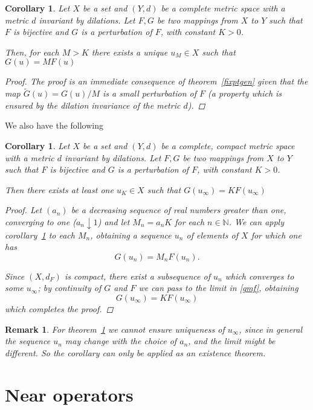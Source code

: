 \documentclass[12pt]{article}
\theoremstyle{normale}
\newtheorem{corollary}[theorem]{Corollary}
\theoremstyle{liscio}
\newtheorem{remark}[theorem]{Remark}
\begin{document}
\begin{corollary}\label{fixm}
Let $X$ be a set and $(Y, d)$ be a complete metric space with
a metric $d$ invariant by dilations. Let $F, G$ be two mappings
from $X$ to $Y$ such that $F$ is bijective and $G$ is
a perturbation of $F$, with constant $K > 0$.

Then, for each $M > K$ there exists a unique $u_M \in X$ such that
$G(u)=M F(u)$
\begin{proof}
The proof is an immediate consequence of theorem~\ref{fixptgen}
given that the map $\tilde G(u) = G(u)/M$ is a small perturbation
of $F$ (a property which is ensured by the dilation invariance of
the metric $d$).
\end{proof}
\end{corollary}

We also have the following
\begin{corollary}\label{fixk}
Let $X$ be a set and $(Y, d)$ be a complete, compact metric space
with a metric $d$ invariant by dilations. Let $F, G$ be two
mappings from $X$ to $Y$ such that $F$ is bijective and $G$ is
a perturbation of $F$, with constant $K > 0$.

Then there exists at least one $u_K \in X$ such that
$G(u_\infty)=K F(u_\infty)$
\begin{proof}
Let $(a_n)$ be a decreasing sequence of real numbers greater than
one, converging to one ($a_n \downarrow 1$) and let $M_n = a_n K$
for each $n \in \mathbb{N}$. We can apply corollary~\ref{fixm} to
each $M_n$, obtaining a sequence $u_n$ of elements of $X$ for
which one has
\begin{equation}\label{gmf}
G(u_n) = M_n F(u_n).
\end{equation}

Since $(X, d_F)$ is compact, there exist a subsequence of $u_n$
which converges to some $u_\infty$; by continuity of $G$ and $F$
we can pass to the limit in \eqref{gmf}, obtaining
\[
G(u_\infty) = K F(u_\infty)
\]
which completes the proof.
\end{proof}
\end{corollary}

\begin{remark}
For theorem~\ref{fixk} we cannot ensure uniqueness of $u_\infty$,
since in general the sequence $u_n$ may change with the choice of
$a_n$, and the limit might be different. So the corollary can only
be applied as an existence theorem.
\end{remark}

\section{Near operators}
\end{document}
